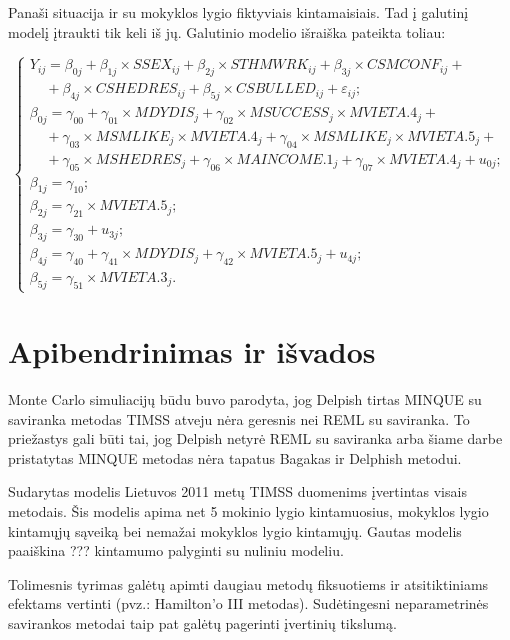 \documentclass[12pt,a4paper]{article}
\begin{document}
\indent Panaši situacija ir su mokyklos lygio fiktyviais kintamaisiais. Tad į galutinį modelį įtraukti tik keli iš jų. Galutinio modelio išraiška pateikta toliau:
\begin{small}
\begin{equation}
\left\{
\begin{array}{l}
Y_{ij}=\beta_{0j}+\beta_{1j}\times SSEX_{ij}+\beta_{2j} \times STHMWRK_{ij}+\beta_{3j}\times CSMCONF_{ij}+\\
\ \ \ \ \ +\beta_{4j}\times CSHEDRES_{ij}+\beta_{5j}\times CSBULLED_{ij}+\varepsilon_{ij};\\
\beta_{0j}=\gamma_{00}+\gamma_{01}\times MDYDIS_j+\gamma_{02}\times MSUCCESS_j\times MVIETA.4_j+\\
\ \ \ \ \ +\gamma_{03}\times MSMLIKE_j\times MVIETA.4_j+\gamma_{04}\times MSMLIKE_j\times MVIETA.5_j+\\
\ \ \ \ \ +\gamma_{05}\times MSHEDRES_j+\gamma_{06}\times MAINCOME.1_j+\gamma_{07}\times MVIETA.4_j+u_{0j};\\
\beta_{1j} = \gamma_{10};\\
\beta_{2j}=\gamma_{21}\times MVIETA.5_j;\\
\beta_{3j}=\gamma_{30}+u_{3j};\\
\beta_{4j}=\gamma_{40}+\gamma_{41}\times MDYDIS_j+\gamma_{42}\times MVIETA.5_j+u_{4j};\\
\beta_{5j}=\gamma_{51}\times MVIETA.3_j.
\end{array} \right.
\end{equation}
\end{small}



\section{Apibendrinimas ir išvados}
\indent Monte Carlo simuliacijų būdu buvo parodyta, jog Delpish tirtas MINQUE su saviranka metodas TIMSS atveju nėra geresnis nei REML su saviranka. To priežastys gali būti tai, jog Delpish netyrė REML su saviranka arba šiame darbe pristatytas MINQUE metodas nėra tapatus Bagakas ir Delphish metodui.

\indent Sudarytas modelis Lietuvos 2011 metų TIMSS duomenims įvertintas visais metodais. Šis modelis apima net 5 mokinio lygio kintamuosius, mokyklos lygio kintamųjų sąveiką bei nemažai mokyklos lygio kintamųjų. Gautas modelis paaiškina ??? kintamumo palyginti su nuliniu modeliu.

\indent Tolimesnis tyrimas galėtų apimti daugiau metodų fiksuotiems ir atsitiktiniams efektams vertinti (pvz.: Hamilton'o III metodas). Sudėtingesni neparametrinės savirankos metodai taip pat galėtų pagerinti įvertinių tikslumą.
\end{document}
